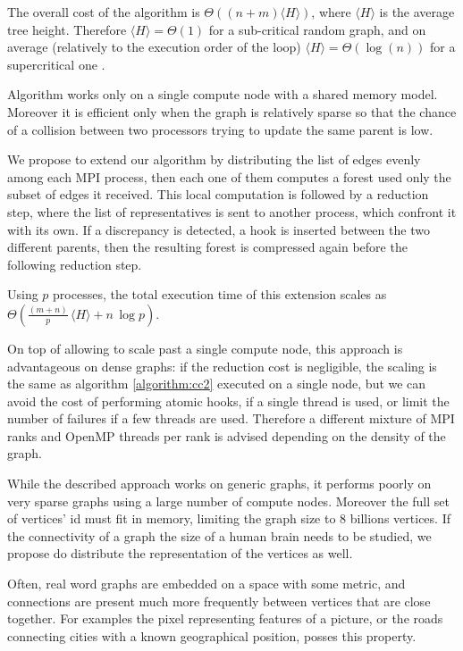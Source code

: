 The overall cost of the algorithm is $\Theta((n + m)\langle H \rangle)$, where $\langle H \rangle$ is
the average tree height. Therefore $\langle H \rangle = \Theta(1)$ for a sub-critical random graph, and on average (relatively to the execution order of the loop) $\langle H \rangle = \Theta(\log(n))$
for a supercritical one \cite{RandomGraph}.

Algorithm \label{algorithm:cc2} works only on a single compute node with a shared memory model. Moreover it is efficient
only when the graph is relatively sparse so that the chance of a collision between two processors trying to update the same parent is low.

We propose to extend our algorithm by distributing the list of edges evenly among each MPI process,
then each one of them computes a forest used only the subset of edges it received. This local computation
is followed by a reduction step, where the list of representatives is sent to another process, which confront it
with its own. If a discrepancy is detected, a hook is inserted between the two different parents, then
the resulting forest is compressed again before the following reduction step.

Using $p$ processes, the total execution time of this extension scales as $\Theta(\frac{(m + n)}{p}\, \langle H \rangle + n\,\log p)$.

On top of allowing to scale past a single compute node, this approach is advantageous on
dense graphs: if the reduction cost is negligible, the scaling is the same as algorithm \ref{algorithm:cc2} executed on a single node,
but we can avoid the cost of performing atomic hooks, if a single thread is used, or limit the number of failures if a few threads are used.
Therefore a different mixture of MPI ranks and OpenMP threads per rank is advised depending on the density of the graph.

While the described approach works on generic graphs, it performs poorly on very sparse graphs using
a large number of compute nodes. Moreover the full set of vertices' id must fit in memory, limiting the
graph size to $8$ billions vertices. If the connectivity of a graph the size of a human brain needs to be studied,
we propose do distribute the representation of the vertices as well.

Often, real word graphs are embedded on a space with some metric, and connections are present much more frequently between
vertices that are close together. For examples the pixel representing features of a picture, or the roads connecting cities
with a known geographical position, posses this property.

